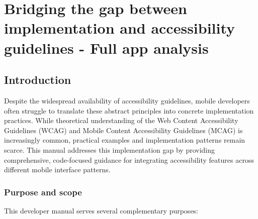 \chapter{Bridging the gap between implementation and accessibility guidelines - Full app analysis}
\label{chap:accessibility-developer-manual}


\section{Introduction}
\label{sec:dev-intro}

Despite the widespread availability of accessibility guidelines, mobile developers often struggle to translate these abstract principles into concrete implementation practices. While theoretical understanding of the Web Content Accessibility Guidelines (WCAG) and Mobile Content Accessibility Guidelines (MCAG) is increasingly common, practical examples and implementation patterns remain scarce. This manual addresses this implementation gap by providing comprehensive, code-focused guidance for integrating accessibility features across different mobile interface patterns.

\subsection{Purpose and scope}
\label{subsec:dev-purpose}

This developer manual serves several complementary purposes:

